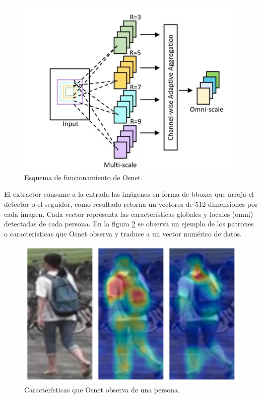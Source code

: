 \begin{figure}[ht]
	\centering
	\includegraphics[scale=.60]{./Figures/osnet.png}
	\caption{Esquema de funcionamiento de Osnet\protect\footnotemark.}
	\label{fig:osnet}
\end{figure}


El extractor consume a la entrada las imágenes en forma de bboxes que arroja el detector o el seguidor, como resultado retorna un vectores de 512 dimensiones por cada imagen. Cada vector representa las características globales y locales (omni) detectadas de cada persona. En la figura \ref{fig:osnetFeatureMap} se observa un ejemplo de los patrones o características que Osnet observa y traduce a un vector numérico de datos.

\begin{figure}[ht]
	\centering
	\includegraphics[scale=.60]{./Figures/osnetFeatureMap.png}
	\caption{Características que Osnet observa de una persona\protect\footnotemark.}
	\label{fig:osnetFeatureMap}
\end{figure}

